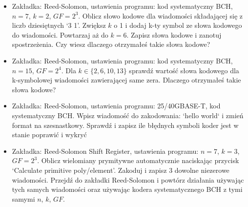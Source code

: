 \begin{itemize}
    \item Zakładka: Reed-Solomon, ustawienia programu: kod systematyczny BCH, $n=7$, $k=2$, $GF=2^3$.
    Oblicz słowo kodowe dla wiadomości składającej się z liczb dziesiętnych `3 1'.
    Zwiększ $k$ o 1 i dodaj k-ty symbol ze słowa kodowego do wiadomości. Powtarzaj aż do $k=6$.
    Zapisz słowa kodowe i zanotuj spostrzeżenia.
    Czy wiesz dlaczego otrzymałeś takie słowa kodowe?
    \item Zakładka: Reed-Solomon, ustawienia programu: kod systematyczny BCH, $n=15$, $GF=2^4$.
    Dla $k \in \{ 2, 6, 10, 13 \}$ sprawdź wartość słowa kodowego dla k-symbolowej wiadomości zawierającej same zera. Dlaczego otrzymałeś takie słowa kodowe?
    \item Zakładka: Reed-Solomon, ustawienia programu: 25/40GBASE-T,
    kod systematyczny BCH. Wpisz wiadomość do zakodowania: `hello world` i zmień format na szesnastkowy. Sprawdź i zapisz ile błędnych symboli koder jest w stanie poprawić i wykryć
    \item Zakładka: Reed-Solomon Shift Register, ustawienia programu: $n = 7$, $k = 3$, $GF = 2^3$. Oblicz wielomiany prymitywne automatycznie naciskając przycisk `Calculate primitive poly/element'.
    Zakoduj i zapisz 3 dowolne niezerowe wiadomości.
    Przejdź do zakładki Reed-Solomon i powtórz działania używając tych samych wiadomości oraz używając kodera systematycznego BCH z tymi samymi $n$, $k$, $GF$.
\end{itemize}
